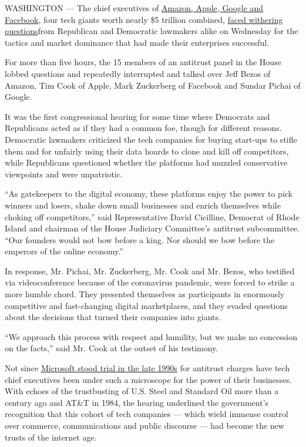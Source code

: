 WASHINGTON --- The chief executives of
\href{https://www.nytimes.com/2020/07/30/podcasts/the-daily/congress-facebook-amazon-google-apple.html}{Amazon,
Apple, Google and Facebook}, four tech giants worth nearly \$5 trillion
combined,
\href{https://www.nytimes.com/live/2020/07/29/technology/tech-ceos-hearing-testimony}{faced
withering questions}from Republican and Democratic lawmakers alike on
Wednesday for the tactics and market dominance that had made their
enterprises successful.

For more than five hours, the 15 members of an antitrust panel in the
House lobbed questions and repeatedly interrupted and talked over Jeff
Bezos of Amazon, Tim Cook of Apple, Mark Zuckerberg of Facebook and
Sundar Pichai of Google.

It was the first congressional hearing for some time where Democrats and
Republicans acted as if they had a common foe, though for different
reasons. Democratic lawmakers criticized the tech companies for buying
start-ups to stifle them and for unfairly using their data hoards to
clone and kill off competitors, while Republicans questioned whether the
platforms had muzzled conservative viewpoints and were unpatriotic.

``As gatekeepers to the digital economy, these platforms enjoy the power
to pick winners and losers, shake down small businesses and enrich
themselves while choking off competitors,'' said Representative David
Cicilline, Democrat of Rhode Island and chairman of the House Judiciary
Committee's antitrust subcommittee. ``Our founders would not bow before
a king. Nor should we bow before the emperors of the online economy.''

In response, Mr. Pichai, Mr. Zuckerberg, Mr. Cook and Mr. Bezos, who
testified via videoconference because of the coronavirus pandemic, were
forced to strike a more humble chord. They presented themselves as
participants in enormously competitive and fast-changing digital
marketplaces, and they evaded questions about the decisions that turned
their companies into giants.

``We approach this process with respect and humility, but we make no
concession on the facts,'' said Mr. Cook at the outset of his testimony.

Not since
\href{https://www.nytimes.com/1999/02/27/business/microsoft-rests-its-case-ending-on-a-misstep.html}{Microsoft
stood trial in the late 1990s} for antitrust charges have tech chief
executives been under such a microscope for the power of their
businesses. With echoes of the trustbusting of U.S. Steel and Standard
Oil more than a century ago and AT\&T in 1984, the hearing underlined
the government's recognition that this cohort of tech companies ---
which wield immense control over commerce, communications and public
discourse --- had become the new trusts of the internet age.

